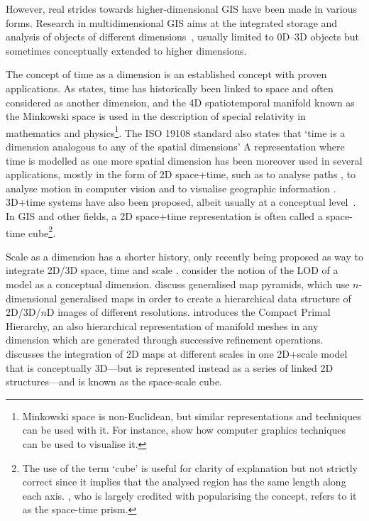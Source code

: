
However, real strides towards higher-dimensional GIS have been made in various forms.
Research in multidimensional GIS aims at the integrated storage and analysis of objects of different dimensions~\citep{Raper00,Gold05}, usually limited to 0D--3D objects but sometimes conceptually extended to higher dimensions.


The concept of time as a dimension is an established concept with proven applications.
As \citet{Couclelis99} states, time has historically been linked to space and often considered as another dimension, and the 4D spatiotemporal manifold known as the Minkowski space \citep{Minkowski08} is used in the description of special relativity in mathematics and physics\footnote{Minkowski space is non-Euclidean, but similar representations and techniques can be used with it. For instance, \citet{Hanson01} show how computer graphics techniques can be used to visualise it.}.
The ISO 19108 standard also states that `time is a dimension analogous to any of the spatial dimensions' \citep{ISO19108:2002}
A representation where time is modelled as one more spatial dimension has been moreover used in several applications, mostly in the form of 2D space+time, such as to analyse paths \citep{Hagerstrand70}, to analyse motion in computer vision \citep{Basri05} and to visualise geographic information \citep{Kraak03}.
3D+time systems have also been proposed, albeit usually at a conceptual level~\citep{Galton04}.
In GIS and other fields, a 2D space+time representation is often called a space-time cube\footnote{The use of the term `cube' is useful for clarity of explanation but not strictly correct since it implies that the analysed region has the same length along each axis. \citet{Hagerstrand70}, who is largely credited with popularising the concept, refers to it as the space-time prism.}.


Scale as a dimension has a shorter history, only recently being proposed as way to integrate 2D/3D space, time and scale \citep{vanOosterom10}.
\citet{Dollner05} consider the notion of the LOD of a model as a conceptual dimension.
\citet{Grasset-Simon06} discuss generalised map pyramids, which use $n$-dimensional generalised maps in order to create a hierarchical data structure of 2D/3D/$n$D images of different resolutions.
\citet{Untereiner15} introduces the Compact Primal Hierarchy, an also hierarchical representation of manifold meshes in any dimension which are generated through successive refinement operations.
\citet{vanOosterom14} discusses the integration of 2D maps at different scales in one 2D+scale model that is conceptually 3D---but is represented instead as a series of linked 2D structures---and is known as the space-scale cube.

